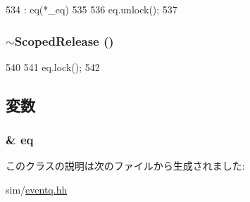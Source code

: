 \begin{DoxyCode}
534             :  eq(*_eq)
535         {
536             eq.unlock();
537         }
\end{DoxyCode}
\hypertarget{classEventQueue_1_1ScopedRelease_a571948d69fe8efeacfa5d8a6c7322287}{
\subsubsection[{$\sim$ScopedRelease}]{\setlength{\rightskip}{0pt plus 5cm}$\sim${\bf ScopedRelease} ()}}
\label{classEventQueue_1_1ScopedRelease_a571948d69fe8efeacfa5d8a6c7322287}



\begin{DoxyCode}
540         {
541             eq.lock();
542         }
\end{DoxyCode}


\subsection{変数}
\hypertarget{classEventQueue_1_1ScopedRelease_a56da388e27fa241c2f0d42fa4188f2a1}{
\subsubsection[{eq}]{\& {\bf eq}}}
\label{classEventQueue_1_1ScopedRelease_a56da388e27fa241c2f0d42fa4188f2a1}


このクラスの説明は次のファイルから生成されました:\begin{DoxyCompactItemize}
\item 
sim/\hyperlink{eventq_8hh}{eventq.hh}\end{DoxyCompactItemize}

